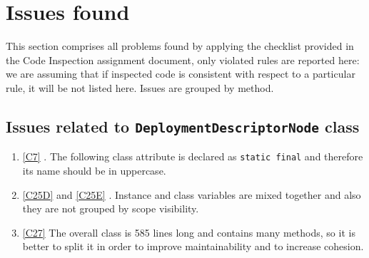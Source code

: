 \newpage
\section{Issues found}
\label{sec:issues}
This section comprises all problems found by applying the checklist provided in the Code Inspection assignment document, only violated rules are reported here: we are assuming that if inspected code is consistent with respect to a particular rule, it will be not listed here.
Issues are grouped by method.
\subsection{Issues related to \texttt{DeploymentDescriptorNode} class}
\begin{enumerate}
	\item \ref{C7} . The following class attribute is declared as \texttt{static final} and therefore its name should be in uppercase. 
	\item \ref{C25D}  and \ref {C25E} . Instance and class variables are mixed together and also they are not grouped by scope visibility. 
	\item \ref{C27} The overall class is 585 lines long and contains many methods, so it is better to split it in order to improve maintainability and to increase cohesion.
\end{enumerate}

